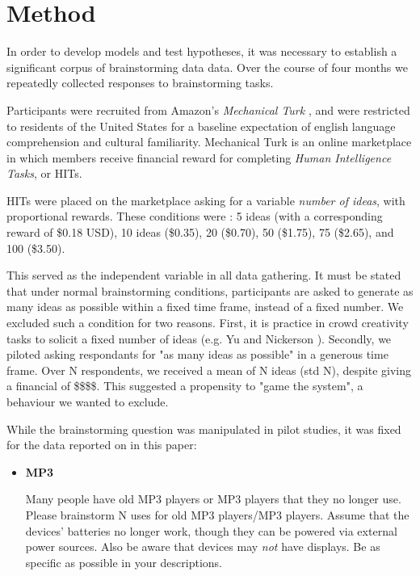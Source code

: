\section{Method}

In order to develop models and test hypotheses, it was necessary to establish a significant corpus of brainstorming data data. Over the course of four months we repeatedly collected responses to brainstorming tasks.

Participants were recruited from Amazon's \emph{Mechanical Turk} \cite{_amazon_????}, and were restricted to residents of the United States for a baseline expectation of english language comprehension and cultural familiarity. Mechanical Turk is an online marketplace in which members receive financial reward for completing \emph{Human Intelligence Tasks}, or HITs.

HITs were placed on the marketplace asking for a variable \emph{number of ideas}, with proportional rewards. These conditions were : 5 ideas (with a corresponding reward of \$0.18 USD), 10 ideas (\$0.35), 20 (\$0.70), 50 (\$1.75), 75 (\$2.65), and 100 (\$3.50).

This served as the independent variable in all data gathering. It must be stated that under normal brainstorming conditions, participants are asked to generate as many ideas as possible within a fixed time frame, instead of a fixed number. We excluded such a condition for two reasons. First, it is practice in crowd creativity tasks to solicit a fixed number of ideas (e.g. Yu and Nickerson \cite{yu_cooks_2011}). Secondly, we piloted asking respondants for "as many ideas as possible" in a generous time frame. Over N respondents, we received a mean of N ideas (std N), despite giving a financial of \$\$\$\$. This suggested a propensity to "game the system", a behaviour we wanted to exclude.

While the brainstorming question was manipulated in pilot studies, it was fixed for the data reported on in this paper:

\begin{itemize}
\item \textbf{MP3}

Many people have old MP3 players or MP3 players that they no longer use. Please brainstorm N uses for old MP3 players/MP3 players. Assume that the devices' batteries no longer work, though they can be powered via external power sources. Also be aware that devices may \emph{not} have displays. Be as specific as possible in your descriptions.
\end{itemize}

